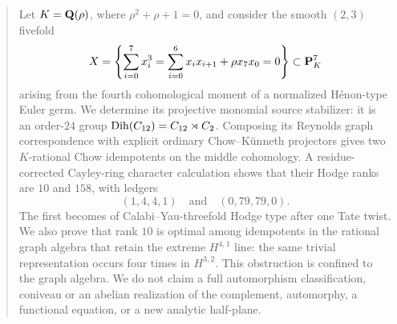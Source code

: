 \begin{abstract}
Let \(K=\Q(\rho)\), where \(\rho^2+\rho+1=0\), and consider the smooth
\((2,3)\) fivefold
\[
 X=\left\{\sum_{i=0}^{7}x_i^3=
 \sum_{i=0}^{6}x_ix_{i+1}+\rho x_7x_0=0\right\}\subset\PP^7_K
\]
arising from the fourth cohomological moment of a normalized
H\'enon-type Euler germ.  We determine its projective monomial source
stabilizer: it is an order-\(24\) group
\(\Dih(C_{12})=C_{12}\rtimes C_2\).  Composing its Reynolds graph
correspondence with explicit ordinary Chow--K\"unneth projectors gives
two \(K\)-rational Chow idempotents on the middle cohomology.  A
residue-corrected Cayley-ring character calculation shows that their
Hodge ranks are \(10\) and \(158\), with ledgers
\[
 (1,4,4,1)\quad\text{and}\quad(0,79,79,0).
\]
The first becomes of Calabi--Yau-threefold Hodge type after one Tate
twist.  We also prove that rank \(10\) is optimal among idempotents in
the rational graph algebra that retain the extreme \(H^{4,1}\) line:
the same trivial representation occurs four times in \(H^{3,2}\).
This obstruction is confined to the graph algebra.  We do not claim a
full automorphism classification, coniveau or an abelian realization of
the complement, automorphy, a functional equation, or a new analytic
half-plane.
\end{abstract}

